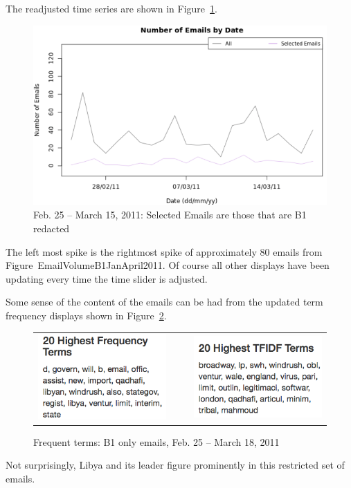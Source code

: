 \documentclass[journal]{vgtc}                %
\begin{document}
The readjusted time series are shown in Figure~\ref{fig:EmailVolumeB1LibyaBuildup}.
\begin{figure}[h]
\begin{center}
\includegraphics[width=0.95\linewidth]{EmailVolumeB1LibyaBuildup}
\caption{Feb. 25 -- March 15, 2011:  Selected Emails are those that are B1 redacted}
\label{fig:EmailVolumeB1LibyaBuildup}
\end{center}
\end{figure}
The left most spike is the rightmost spike of approximately 80 emails from Figure~{EmailVolumeB1JanApril2011}.   
Of course all other displays have been updating every time the time slider is adjusted.  

Some sense of the content of the emails can be had from the updated term frequency displays shown in Figure~\ref{fig:TermFreqB1LibyaBuildup}.
\begin{figure}[h]
\begin{center}
\begin{tabular}{ccc}
\includegraphics[width=0.4\linewidth]{TFIDFB1LibyaBuildup} &
$~~~~$ &
\includegraphics[width=0.4\linewidth]{TermFreqB1LibyaBuildup} 
\end{tabular}
\caption{Frequent terms: B1 only emails, Feb. 25 -- March 18, 2011}
\label{fig:TermFreqB1LibyaBuildup}
\end{center}
\end{figure}
Not surprisingly,  Libya and its leader figure prominently in this restricted set of emails.  
\end{document}
